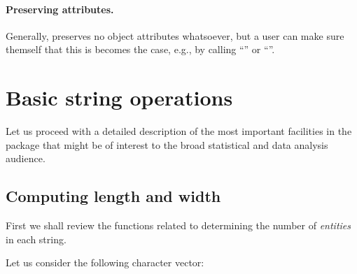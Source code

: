 \documentclass[nojss]{jss}
\begin{document}
\paragraph{Preserving attributes.}
Generally,  preserves no object attributes
whatsoever, but a user can make sure themself
that this is becomes the case, e.g., by calling
``''
or ``''.










\section{Basic string operations}\label{Sec:basic}

Let us proceed with a detailed description of the most important
facilities in the  package that might be of interest to
the broad statistical and data analysis audience.



\subsection{Computing length and width}


First we shall review the functions related to determining
the number of \textit{entities} in each string.



Let us consider the following character vector:
\end{document}
